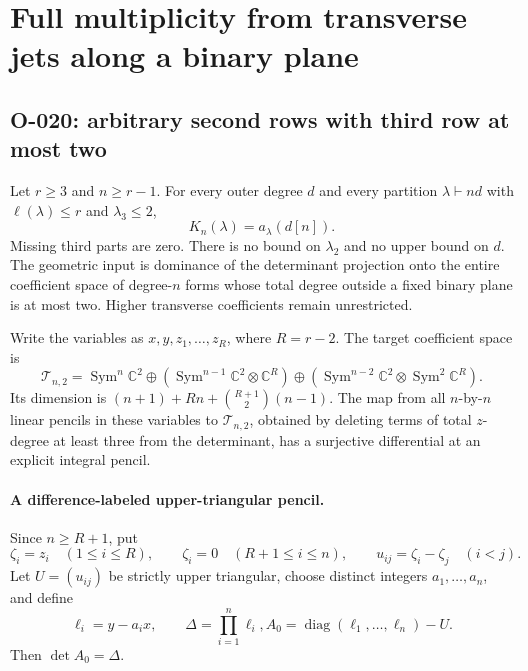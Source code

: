 \section{Full multiplicity from transverse jets along a binary plane}

\subsection{O-020: arbitrary second rows with third row at most two}
Let $r\geq3$ and $n\geq r-1$. For every outer degree $d$
and every partition $\lambda\vdash nd$ with
$\ell(\lambda)\leq r$ and $\lambda_3\leq2$,
\[
                         K_n(\lambda)=a_\lambda(d[n]).
                                                               \tag{O-020.1}
\]
Missing third parts are zero. There is no bound on
$\lambda_2$ and no upper bound on $d$.
The geometric input is dominance of the determinant projection
onto the entire coefficient space of degree-$n$ forms whose
total degree outside a fixed binary plane is at most two.
Higher transverse coefficients remain unrestricted.

Write the variables as $x,y,z_1,\ldots,z_R$, where $R=r-2$.
The target coefficient space is
\[
 \mathcal T_{n,2}=
 \operatorname{Sym}^n\mathbb C^2
 \oplus\left(\operatorname{Sym}^{n-1}\mathbb C^2
                               \otimes\mathbb C^R\right)
 \oplus\left(\operatorname{Sym}^{n-2}\mathbb C^2
                               \otimes\operatorname{Sym}^2\mathbb C^R\right).
                                                               \tag{O-020.2}
\]
Its dimension is $(n+1)+Rn+\binom{R+1}{2}(n-1)$.
The map from all $n$-by-$n$ linear pencils in these variables
to $\mathcal T_{n,2}$, obtained by deleting terms of
total $z$-degree at least three from the determinant,
has a surjective differential at an explicit integral pencil.

\paragraph{A difference-labeled upper-triangular pencil.}
Since $n\geq R+1$, put
\[
 \zeta_i=z_i\quad(1\leq i\leq R),\qquad
 \zeta_i=0\quad(R+1\leq i\leq n),\qquad
 u_{ij}=\zeta_i-\zeta_j\quad(i<j).
\]
Let $U=(u_{ij})$ be strictly upper triangular, choose distinct integers
$a_1,\ldots,a_n$, and define
\[
 \ell_i=y-a_ix,\qquad \Delta=\prod_{i=1}^n\ell_i,
             A_0=\operatorname{diag}(\ell_1,\ldots,\ell_n)-U.
                                                               \tag{O-020.3}
\]
Then $\det A_0=\Delta$.


